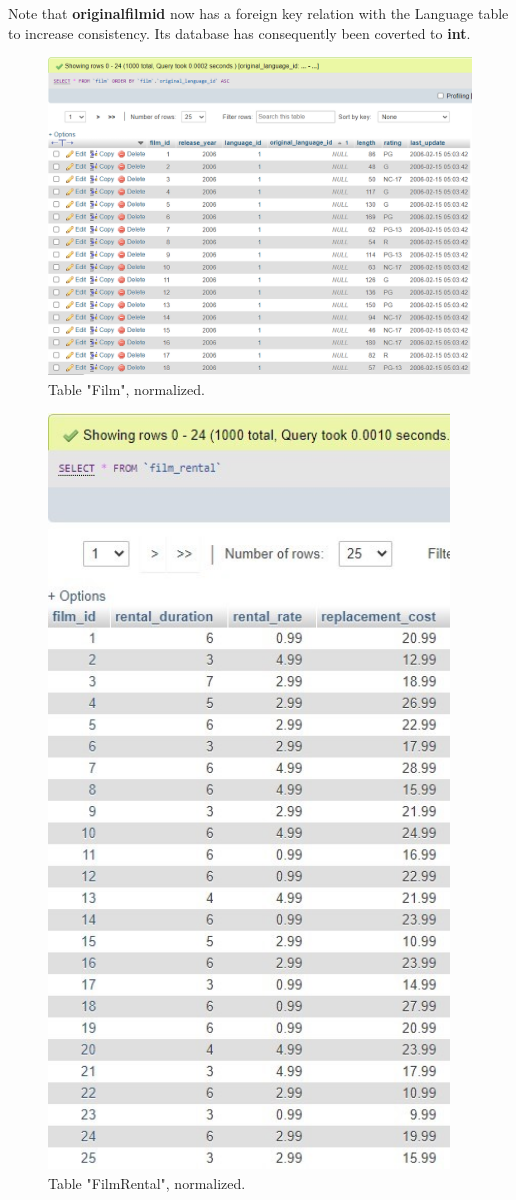\documentclass[openany]{article}
\begin{document}
		Note that \textbf{original\textunderscore film\textunderscore id} now has a foreign key relation with the Language table to increase consistency. Its database has consequently been coverted to \textbf{int}.
		\begin{figure}[H]
			\includegraphics[width=\textwidth]{table_film_norm}
			\caption{Table "Film", normalized.}
		\end{figure}
		\begin{figure}[H]
			\includegraphics[height = 20cm]{table_filmrental_norm}
			\caption{Table "Film\textunderscore Rental", normalized.}
		\end{figure}
\end{document}
